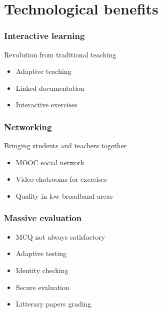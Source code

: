 \section{Technological benefits}
\setcounter{subsection}{1}
\begin{frame}
\frametitle{Interactive learning}
  Revolution from traditional teaching
  \begin{itemize}[<+->]
    \item Adaptive teaching
    \item Linked documentation
    \item Interactive exercises
  \end{itemize}
\end{frame}

\begin{frame}
\frametitle{Networking}
  Bringing students and teachers together
  \begin{itemize}[<+->]
    \item MOOC social network
    \item Video chatrooms for exercises
    \item Quality in low broadband areas
  \end{itemize}
\end{frame}

\begin{frame}
\frametitle{Massive evaluation}
  \begin{itemize}[<+->]
    \item MCQ not always satisfactory
    \item Adaptive testing
    \item Identity checking
    \item Secure evaluation
    \item Litterary papers grading
  \end{itemize}
\end{frame}
